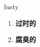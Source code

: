 
\begin{frame}
{\huge fusty}
\begin{center}
\begin{enumerate}\Large
  \item \textbf{过时的}
  \item \textbf{腐臭的}
\end{enumerate}
\end{center}
\end{frame}
